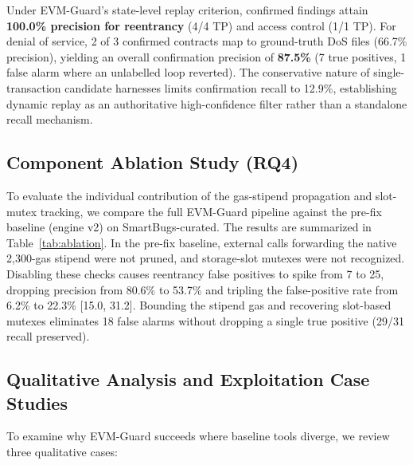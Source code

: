 \documentclass[conference]{IEEEtran}
\begin{document}
Under EVM-Guard's state-level replay criterion, confirmed findings attain \textbf{100.0\% precision for reentrancy} (4/4 TP) and access control (1/1 TP). For denial of service, 2 of 3 confirmed contracts map to ground-truth DoS files (66.7\% precision), yielding an overall confirmation precision of \textbf{87.5\%} (7 true positives, 1 false alarm where an unlabelled loop reverted). The conservative nature of single-transaction candidate harnesses limits confirmation recall to 12.9\%, establishing dynamic replay as an authoritative high-confidence filter rather than a standalone recall mechanism.

\subsection{Component Ablation Study (RQ4)}
To evaluate the individual contribution of the gas-stipend propagation and slot-mutex tracking, we compare the full EVM-Guard pipeline against the pre-fix baseline (engine v2) on SmartBugs-curated. The results are summarized in Table~\ref{tab:ablation}. In the pre-fix baseline, external calls forwarding the native 2,300-gas stipend were not pruned, and storage-slot mutexes were not recognized. Disabling these checks causes reentrancy false positives to spike from 7 to 25, dropping precision from 80.6\% to 53.7\% and tripling the false-positive rate from 6.2\% to 22.3\% [15.0, 31.2]. Bounding the stipend gas and recovering slot-based mutexes eliminates 18 false alarms without dropping a single true positive (29/31 recall preserved).

\begin{table}[h]
\centering
\small
\renewcommand{\arraystretch}{1.12}
\caption{Component Ablation Analysis over SmartBugs Reentrancy}
\label{tab:ablation}
\end{table}

\subsection{Qualitative Analysis and Exploitation Case Studies}
To examine why EVM-Guard succeeds where baseline tools diverge, we review three qualitative cases:
\end{document}
